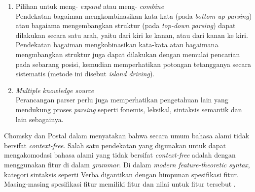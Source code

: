 \begin{enumerate}
	\item Pilihan untuk meng- \emph{expand} atau meng- \emph{combine}\\
	Pendekatan bagaiman mengkombinasikan kata-kata (pada \emph{bottom-up parsing}) atau bagaiama mengembangkan struktur (pada \emph{top-down parsing}) dapat dilakukan secara satu arah, yaitu dari kiri ke kanan, atau dari kanan ke kiri. Pendekatan bagaiman mengkobinasikan kata-kata atau bagaimana mengmbangkan struktur juga dapat dilakukan dengan memulai pencarian pada sebarang posisi, kemudian memperhatikan potongan tetangganya secara sistematis (metode ini disebut \emph{island driving}).

	\item \emph{Multiple knowledge source}\\
	Perancangan parser perlu juga memperhatikan pengetahuan lain yang mendukung proses \emph{parsing} seperti fonemis, leksikal, sintaksis semantik dan lain sebagainya.
\end{enumerate}

Chomsky dan Postal dalam \citet{bar_feigenbaum} menyatakan bahwa secara umum bahasa alami tidak bersifat \emph{context-free}. Salah satu pendekatan yang digunakan untuk dapat mengakomodasi bahasa alami yang tidak bersifat \emph{context-free} adalah dengan menggunakan fitur di dalam \emph{grammar}. Di dalam \emph{modern feature-theoretic syntax}, kategori sintaksis seperti Verba digantikan dengan himpunan spesifikasi fitur. Masing-masing spesifikasi fitur memiliki fitur dan nilai untuk fitur tersebut \citep{gazdar_mellish}.
